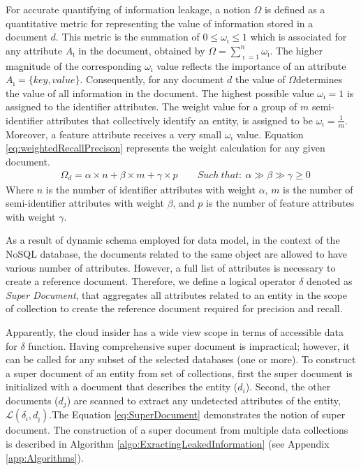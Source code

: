 \noindent For accurate quantifying of information leakage, a notion $ \Omega$ is defined as a quantitative metric for representing the value of information stored in a document $d$. This metric is the summation of $0 \leq \omega_\imath \leq 1$ which is associated for any attribute $A_\imath$ in the document, obtained by $\Omega=\sum\limits_{\imath=1}^n \omega_\imath$. The higher magnitude of the corresponding
$\omega_\imath$ value reflects the importance of an attribute $A_\imath=\{key, value\}$. Consequently, for any document $d$ the value of $\Omega$determines the value of all information in the document. The highest possible value  $\omega_\imath = 1$ is assigned to the identifier attributes. The weight value for a group of $m$ semi-identifier attributes that collectively identify an entity, is assigned to be  $\omega_\imath=\frac{1}{m}$. Moreover, a feature attribute receives a very small $\omega_\imath$ value. Equation \ref{eq:weightedRecallPrecison} represents the weight calculation for any given document.\\

\begin{equation}
\label{eq:weightedRecallPrecison}
\begin{aligned}
& \Omega_d=\alpha \times n + \beta \times m + \gamma \times p \qquad
 Such~ that:~ \alpha \gg \beta \gg \gamma \geq 0
\end{aligned}
\end{equation}
Where $n$ is the number of identifier attributes with weight $\alpha$, $m$ is the number of semi-identifier attributes with weight $\beta$, and $p$ is the number of feature attributes with weight $\gamma$.


As a result of dynamic schema employed for data model, in the context of the NoSQL database, the documents related to the same object are allowed to have various number of attributes. However, a full list of attributes is necessary to create a reference document. Therefore, we define a logical operator $\delta$ denoted as \emph{Super Document}, that aggregates all attributes related to an entity in the scope of collection to create the reference document required for precision and recall. 

Apparently, the cloud insider has a wide view scope in terms of accessible data for $\delta$ function. Having comprehensive super document is impractical; however, it can be called for any subset of the selected databases (one or more). To construct a super document of an entity from set of collections, first the super document is initialized with a document that describes the entity ($d_i$). Second, the other documents ($d_j$) are scanned to extract any undetected attributes of the entity, $\mathcal{L}(\delta_{\imath},d_\jmath)$.The Equation \ref{eq:SuperDocument} demonstrates the notion of super document. The construction of a super document from multiple data collections is described in Algorithm \ref{algo:ExractingLeakedInformation} (see Appendix \ref{app:Algorithms}).

